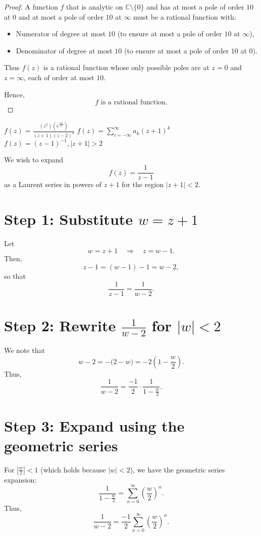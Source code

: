 \documentclass[12pt]{article}
\theoremstyle{definition} %
\theoremstyle{plain} %
\begin{document}
\begin{proof}
A function $f$ that is analytic on $\mathbb{C}\setminus\{0\}$ and has at most a pole of order $10$ at $0$ and at most a pole of order $10$ at $\infty$ must be a rational function with:
\begin{itemize}
\item Numerator of degree at most $10$ (to ensure at most a pole of order $10$ at $\infty$),
\item Denominator of degree at most $10$ (to ensure at most a pole of order $10$ at $0$).
\end{itemize}

Thus $f(z)$ is a rational function whose only possible poles are at $z=0$ and $z=\infty$, each of order at most $10$. 

Hence,
\[
\boxed{f \text{ is a rational function.}}
\]

\end{proof}

$f(z) = \frac{(z^{2})(e^{\frac{4\pi i}{z}})}{(z+1)(z-2)^{3}}$ 
$f(z) = \sum_{i=-\infty }^{\infty }a_{k}(z+1)^{k} $ 
$f(z) = (z-1)^{-1}, \left\vert z+1 \right\vert > 2$

We wish to expand
\[
f(z)=\frac{1}{z-1}
\]
as a Laurent series in powers of \(z+1\) for the region \(|z+1| < 2\).

\section*{Step 1: Substitute \(w = z+1\)}
Let
\[
w = z+1 \quad \Longrightarrow \quad z = w-1.
\]
Then,
\[
z-1 = (w-1) - 1 = w-2,
\]
so that
\[
\frac{1}{z-1} = \frac{1}{w-2}.
\]

\section*{Step 2: Rewrite \(\frac{1}{w-2}\) for \(|w| < 2\)}
We note that
\[
w-2 = -\bigl(2-w\bigr) = -2\left(1-\frac{w}{2}\right).
\]
Thus,
\[
\frac{1}{w-2} = \frac{-1}{2}\cdot\frac{1}{1-\frac{w}{2}}.
\]

\section*{Step 3: Expand using the geometric series}
For \(\left|\frac{w}{2}\right|<1\) (which holds because \(|w|<2\)), we have the geometric series expansion:
\[
\frac{1}{1-\frac{w}{2}} = \sum_{n=0}^{\infty} \left(\frac{w}{2}\right)^n.
\]
Thus,
\[
\frac{1}{w-2} = \frac{-1}{2} \sum_{n=0}^{\infty} \left(\frac{w}{2}\right)^n.
\]
\end{document}
